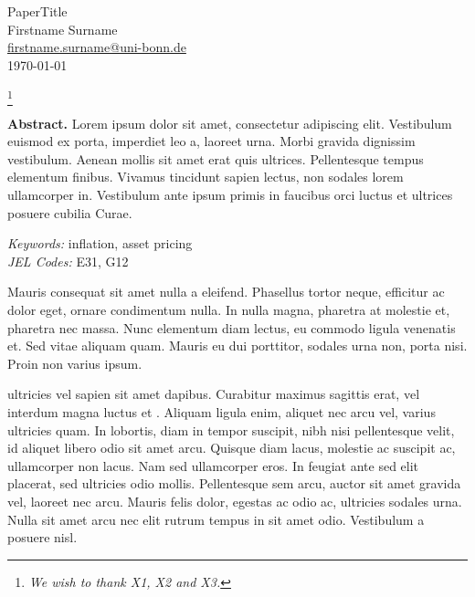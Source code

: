 \documentclass[11pt,a4paper]{article}
\newcommand\blfootnote[1]{%
  \begingroup
  \renewcommand\thefootnote{}\footnote{#1}%
  \addtocounter{footnote}{-1}%
  \endgroup
}
\begin{document}
\vspace*{0.5cm}

\thispagestyle{empty} %

\begin{center}
{\LARGE PaperTitle}\\[0.4cm]
 {\large Firstname Surname}\\[0.2cm]
  {\large \href{mailto:firstname.surname@uni-bonn.de}{firstname.surname@uni-bonn.de}}\\[0.2cm]
 {\large \today}\\
\end{center}

\blfootnote{\textit{\textbullet \phantom{a} We wish to thank X1, X2 and X3.}}

\vspace*{-0.1cm}
\begin{center}
\begin{minipage}{0.9\textwidth}
\textbf{Abstract.} Lorem ipsum dolor sit amet, consectetur adipiscing elit. Vestibulum euismod ex porta, imperdiet leo a, laoreet urna. Morbi gravida dignissim vestibulum. Aenean mollis sit amet erat quis ultrices. Pellentesque tempus elementum finibus. Vivamus tincidunt sapien lectus, non sodales lorem ullamcorper in. Vestibulum ante ipsum primis in faucibus orci luctus et ultrices posuere cubilia Curae.\\[0.3cm]
\begin{footnotesize}
\textit{Keywords:} inflation, asset pricing\\
\textit{JEL Codes:} E31, G12\\
\end{footnotesize}
\end{minipage}
\end{center}


Mauris consequat sit amet nulla a eleifend. Phasellus tortor neque, efficitur ac dolor eget, ornare condimentum nulla. In nulla magna, pharetra at molestie et, pharetra nec massa. Nunc elementum diam lectus, eu commodo ligula venenatis et. Sed vitae aliquam quam. Mauris eu dui porttitor, sodales urna non, porta nisi. Proin non varius ipsum.

\cite{F1953} ultricies vel sapien sit amet dapibus. Curabitur maximus sagittis erat, vel interdum magna luctus et \citep{E2011}. Aliquam ligula enim, aliquet nec arcu vel, varius ultricies quam. In lobortis, diam in tempor suscipit, nibh nisi pellentesque velit, id aliquet libero odio sit amet arcu. Quisque diam lacus, molestie ac suscipit ac, ullamcorper non lacus. Nam sed ullamcorper eros. In feugiat ante sed elit placerat, sed ultricies odio mollis. Pellentesque sem arcu, auctor sit amet gravida vel, laoreet nec arcu. Mauris felis dolor, egestas ac odio ac, ultricies sodales urna. Nulla sit amet arcu nec elit rutrum tempus in sit amet odio. Vestibulum a posuere nisl.
\end{document}
